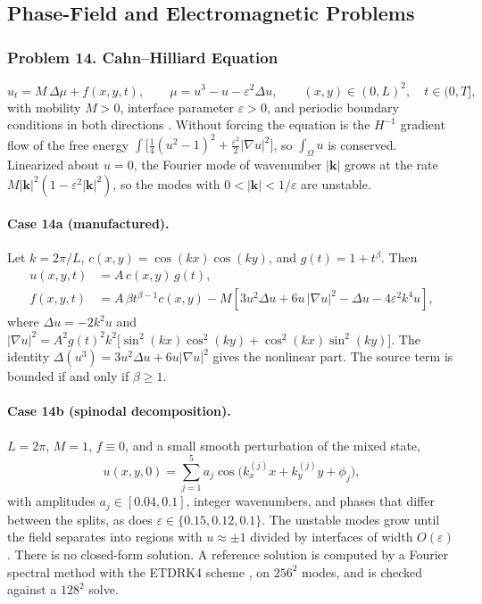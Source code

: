 \documentclass[11pt]{article}
\begin{document}
\subsection{Phase-Field and Electromagnetic Problems}

\subsubsection*{Problem 14. Cahn--Hilliard Equation}

\[
\boxed{u_t=M\,\Delta\mu+f(x,y,t),\qquad \mu=u^3-u-\varepsilon^2\Delta u},
\qquad (x,y)\in(0,L)^2,
\quad t\in(0,T],
\]
with mobility $M>0$, interface parameter $\varepsilon>0$, and periodic
boundary conditions in both directions \cite{CH58}. Without forcing the
equation is the $H^{-1}$ gradient flow of the free energy
$\int\bigl[\tfrac14(u^2-1)^2+\tfrac{\varepsilon^2}{2}|\nabla u|^2\bigr]$,
so $\int_\Omega u$ is conserved. Linearized about $u=0$, the Fourier mode
of wavenumber $|\mathbf{k}|$ grows at the rate
$M|\mathbf{k}|^2(1-\varepsilon^2|\mathbf{k}|^2)$, so the modes with
$0<|\mathbf{k}|<1/\varepsilon$ are unstable.

\paragraph{Case 14a (manufactured).}
Let $k=2\pi/L$, $c(x,y)=\cos(kx)\cos(ky)$, and $g(t)=1+t^\beta$. Then
\[
\begin{aligned}
u(x,y,t)&=A\,c(x,y)\,g(t),\\
f(x,y,t)&=A\,\beta t^{\beta-1}c(x,y)
-M\left[3u^2\Delta u+6u\,|\nabla u|^2-\Delta u-4\varepsilon^2k^4u\right],
\end{aligned}
\]
where $\Delta u=-2k^2u$ and
$|\nabla u|^2=A^2g(t)^2k^2\bigl[\sin^2(kx)\cos^2(ky)+\cos^2(kx)\sin^2(ky)\bigr]$.
The identity $\Delta(u^3)=3u^2\Delta u+6u|\nabla u|^2$ gives the
nonlinear part. The source term is bounded if and only if $\beta\ge1$.

\paragraph{Case 14b (spinodal decomposition).}
$L=2\pi$, $M=1$, $f\equiv0$, and a small smooth perturbation of the
mixed state,
\[
u(x,y,0)=\sum_{j=1}^{5}a_j\cos\bigl(k^{(j)}_xx+k^{(j)}_yy+\phi_j\bigr),
\]
with amplitudes $a_j\in[0.04,0.1]$, integer wavenumbers, and phases that
differ between the splits, as does $\varepsilon\in\{0.15,0.12,0.1\}$.
The unstable modes grow until the field separates into regions with
$u\approx\pm1$ divided by interfaces of width $O(\varepsilon)$. There is
no closed-form solution. A reference solution is computed by a Fourier
spectral method with the ETDRK4 scheme \cite{KT05}, on $256^2$ modes, and
is checked against a $128^2$ solve.
\end{document}
